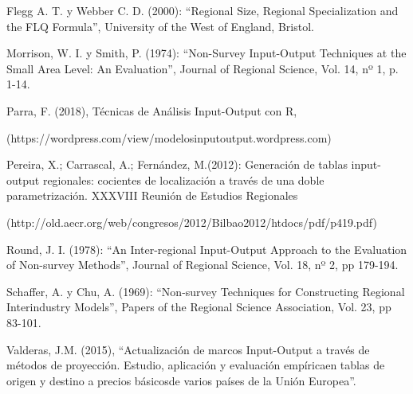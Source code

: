 \documentclass{article}
\begin{document}
Flegg A. T. y Webber C. D. (2000): “Regional Size, Regional Specialization and the FLQ Formula”, University of the West of England, Bristol.

Morrison, W. I. y Smith, P. (1974): “Non-Survey Input-Output Techniques at the Small Area Level: An Evaluation”, Journal of Regional Science, Vol. 14, nº 1, p. 1-14.

Parra, F. (2018), Técnicas de Análisis Input-Output con R,

(https://wordpress.com/view/modelosinputoutput.wordpress.com)

Pereira, X.; Carrascal, A.; Fernández, M.(2012): Generación de tablas input-output regionales: cocientes de localización a través de una doble parametrización.
XXXVIII Reunión de Estudios Regionales

(http://old.aecr.org/web/congresos/2012/Bilbao2012/htdocs/pdf/p419.pdf)


Round, J. I. (1978): “An Inter-regional Input-Output Approach to the Evaluation of Non-survey Methods”, Journal of Regional Science, Vol. 18, nº 2, pp 179-194.

Schaffer, A. y Chu, A. (1969): “Non-survey Techniques for Constructing Regional Interindustry Models”, Papers of the Regional Science Association, Vol. 23, pp 83-101.

Valderas, J.M. (2015), “Actualización de marcos Input-Output a través de métodos de proyección. Estudio, aplicación y evaluación empíricaen tablas de origen y destino a precios básicosde varios países de la Unión Europea”.
\end{document}
